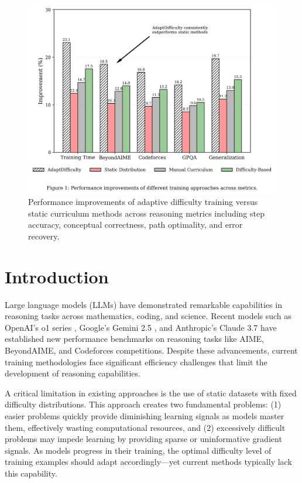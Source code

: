 \begin{figure}[H]
    \centering
    \includegraphics[width=\textwidth]{figures/performance_comparison.png}
    \caption{Performance improvements of adaptive difficulty training versus static curriculum methods across reasoning metrics including step accuracy, conceptual correctness, path optimality, and error recovery.}
    \label{fig:performance-comparison}
\end{figure}


\section{Introduction}
Large language models (LLMs) have demonstrated remarkable capabilities in reasoning tasks across mathematics, coding, and science. Recent models such as OpenAI's o1 series \cite{openai2023gpt4}, Google's Gemini 2.5 \cite{google2023gemini}, and Anthropic's Claude 3.7 \cite{anthropic2023claude} have established new performance benchmarks on reasoning tasks like AIME, BeyondAIME, and Codeforces competitions. Despite these advancements, current training methodologies face significant efficiency challenges that limit the development of reasoning capabilities.

A critical limitation in existing approaches is the use of static datasets with fixed difficulty distributions. This approach creates two fundamental problems: (1) easier problems quickly provide diminishing learning signals as models master them, effectively wasting computational resources, and (2) excessively difficult problems may impede learning by providing sparse or uninformative gradient signals. As models progress in their training, the optimal difficulty level of training examples should adapt accordingly—yet current methods typically lack this capability.

